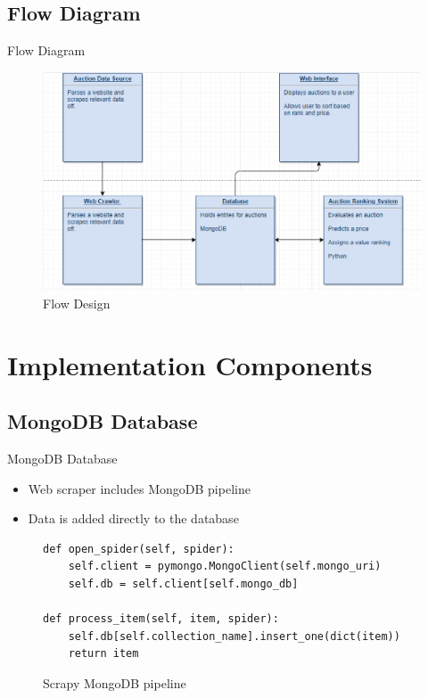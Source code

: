 \documentclass{beamer}
\begin{document}
\subsection{Flow Diagram}
\begin{frame}{Flow Diagram}
\begin{figure}[ht]
\centering
\includegraphics[scale=0.5]{flow_capture}
\caption{Flow Design}
\label{fig:flow}
\end{figure}
\end{frame}

\section{Implementation Components}

\subsection{MongoDB Database}

\begin{frame}[fragile=singleslide]{MongoDB Database}
\begin{itemize}
\setlength\itemsep{2em}
\item Web scraper includes MongoDB pipeline
\item Data is added directly to the database
\end{itemize}
\begin{figure}[ht]
\begin{verbatim}
def open_spider(self, spider):
    self.client = pymongo.MongoClient(self.mongo_uri)
    self.db = self.client[self.mongo_db]

def process_item(self, item, spider):
    self.db[self.collection_name].insert_one(dict(item))
    return item
\end{verbatim}
\caption{Scrapy MongoDB pipeline}
\end{figure}
\end{frame}
\end{document}
